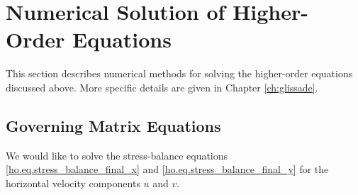 
\section{Numerical Solution of Higher-Order Equations}
\label{sc:higher-order-numerics}

This section describes numerical methods for solving the higher-order equations discussed above. More specific details are given in Chapter \ref{ch:glissade}.

\subsection{Governing Matrix Equations}
We would like to solve the stress-balance equations \eqref{ho.eq.stress_balance_final_x} and \eqref{ho.eq.stress_balance_final_y} for the
horizontal velocity components $u$ and $v$.
